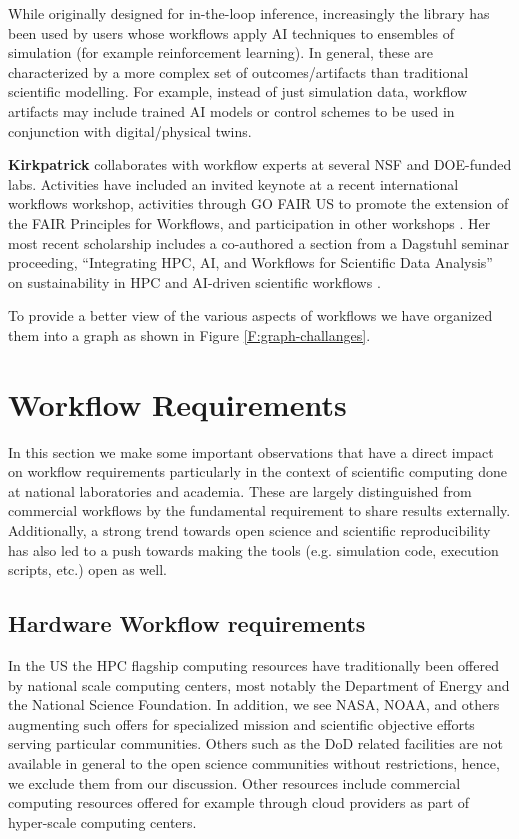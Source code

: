 \documentclass[utf8]{FrontiersinVancouver} %
\begin{document}
While originally designed for in-the-loop inference, increasingly the library has been used by users whose workflows apply AI techniques to ensembles of simulation (for example reinforcement learning). In general, these are characterized by a more complex set of outcomes/artifacts than traditional scientific modelling. For example, instead of just simulation data, workflow artifacts may include trained AI models or control schemes to be used in conjunction with digital/physical twins. 

{\bf Kirkpatrick} collaborates with workflow experts at several NSF and DOE-funded labs. Activities have included an invited keynote at a recent international workflows workshop, activities through GO FAIR US to promote the extension of the FAIR Principles for Workflows, and participation in other workshops \cite{kirkpatrick2023}. Her most recent scholarship includes a co-authored a section from a Dagstuhl seminar proceeding, ``Integrating HPC, AI, and Workflows for Scientific Data Analysis'' on sustainability in HPC and AI-driven scientific workflows \citep{badia2024integrating}.

To provide a better view of the various aspects of workflows we have organized them into a graph as shown in Figure \ref{F:graph-challanges}.




\section{Workflow Requirements}

In this section we make some important observations that have a direct impact on workflow requirements particularly in the context of scientific computing done at national laboratories and academia. These are largely distinguished from commercial workflows by the fundamental requirement to share results externally. Additionally, a strong trend towards open science and scientific reproducibility has also led to a push towards making the tools (e.g. simulation code, execution scripts, etc.) open as well.  

\subsection{Hardware Workflow requirements}\label{sec:hw-requirements}

In the US the HPC flagship computing resources have traditionally been offered by national scale computing centers, most notably the Department of Energy and the National Science Foundation. In addition, we see NASA, NOAA, and others augmenting such offers for specialized mission and scientific objective efforts serving particular communities. Others such as the DoD related facilities are not available in general to the open science communities without restrictions, hence, we exclude them from our discussion. Other resources include commercial computing resources offered for example through cloud providers as part of hyper-scale computing centers.
\end{document}
